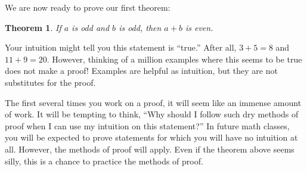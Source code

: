 \documentclass{book}
\newcounter{ekcounter}%
\theoremstyle{ekimcustom}
\newtheorem{theorem}[ekcounter]{Theorem}
\begin{document}
We are now ready to prove our first theorem:
\begin{theorem}\label{theorem:odd-plus-odd-is-even}
If $a$ is odd and $b$ is odd, then $a+b$ is even.
\end{theorem}
Your intuition might tell you this statement is ``true.'' After all, $3+5=8$ and $11+9=20$. However, thinking of a million examples where this seems to be true does not make a proof! Examples are helpful as intuition, but they are not substitutes for the proof.

The first several times you work on a proof, it will seem like an immense amount of work. It will be tempting to think, ``Why should I follow such dry methods of proof when I can use my intuition on this statement?'' In future math classes, you will be expected to prove statements for which you will have no intuition at all. However, the methods of proof will apply. Even if the theorem above seems silly, this is a chance to practice the methods of proof.
\end{document}
